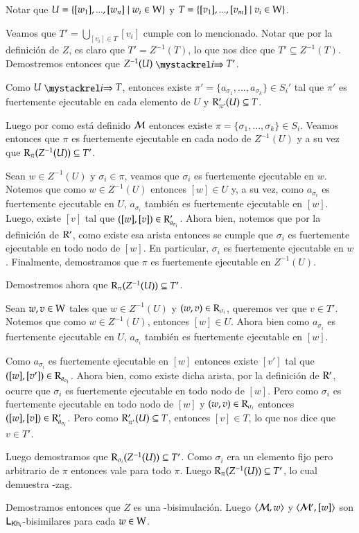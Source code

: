 \begin{demostracion}
\begin{itemize}
        Notar que $U = \{[w_1],...,[w_n]\mid w_i \in \mathrm{W} \}$ y $T = \{[v_1],...,[v_m]\mid v_i \in \mathrm{W} \}$.
        
        Veamos que $T' = \bigcup\limits_{[v_i] \in T} [v_i]$ cumple con lo mencionado. Notar que por la definición de $Z$, es claro que $T' = Z^{-1}(T)$, lo que nos dice que $T' \subseteq Z^{-1}(T)$. Demostremos entonces que $Z^{-1}(U) \ultsExecAgi T'$. 
    
        Como $U \ultsExecAgi T$, entonces existe $\pi' = \{a_{\sigma_1},...,a_{\sigma_k}\}\in S_i'$ tal que $\pi'$ es fuertemente ejecutable en cada elemento de $U$ y $\mathrm{R}'_{\pi'}(U) \subseteq T$.

        Luego por como está definido $\mathcal{M}$ entonces existe $\pi = \{\sigma_1,...,\sigma_k\} \in S_i$. Veamos entonces que $\pi$ es fuertemente ejecutable en cada nodo de $Z^{-1}(U)$ y a su vez que $\mathrm{R}_\pi(Z^{-1}(U)) \subseteq T'$.

        Sean $w \in Z^{-1}(U)$ y $\sigma_i \in \pi$, veamos que $\sigma_i$ es fuertemente ejecutable en $w$. Notemos que como $w \in Z^{-1}(U)$ entonces $[w] \in U$ y, a su vez, como $a_{\sigma_i}$ es fuertemente ejecutable en $U$, $a_{\sigma_i}$ también es fuertemente ejecutable en $[w]$. Luego, existe $[v]$ tal que $([w],[v]) \in \mathrm{R}'_{a_{\sigma_i}}$. Ahora bien, notemos que por la definición de $\mathrm{R}'$, como existe esa arista entonces se cumple que $\sigma_i$ es fuertemente ejecutable en todo nodo de $[w]$. En particular, $\sigma_i$ es fuertemente ejecutable en $w$. Finalmente, demostramos que $\pi$ es fuertemente ejecutable en $Z^{-1}(U)$.

        Demostremos ahora que $\mathrm{R}_{\pi}(Z^{-1}(U)) \subseteq T'$. 

        Sean $w, v \in \mathrm{W}$ tales que $w \in Z^{-1}(U)$ y $(w,v) \in \mathrm{R}_{\sigma_i}$, queremos ver que $v \in T'$. Notemos que como $w \in Z^{-1}(U)$, entonces $[w] \in U$. Ahora bien como $a_{\sigma_i}$ es fuertemente ejecutable en $U$, $a_{\sigma_i}$ también es fuertemente ejecutable en $[w]$.
        
        Como $a_{\sigma_i}$ es fuertemente ejecutable en $[w]$ entonces existe $[v']$ tal que $([w],[v']) \in \mathrm{R}_{a_{\sigma_i}}$. Ahora bien, como existe dicha arista, por la definición de $\mathrm{R}'$, ocurre que $\sigma_i$ es fuertemente ejecutable en todo nodo de $[w]$. Pero como $\sigma_i$ es fuertemente ejecutable en todo nodo de $[w]$ y $(w,v) \in \mathrm{R}_{\sigma_i}$ entonces $([w],[v]) \in \mathrm{R}'_{a_{\sigma_i}}$. Pero como $\mathrm{R}'_{\pi'}(U) \subseteq T$, entonces $[v] \in T$, lo que nos dice que $v \in T'$.
        
        Luego demostramos que $\mathrm{R}_{\sigma_i}(Z^{-1}(U)) \subseteq T'$. Como $\sigma_i$ era un elemento fijo pero arbitrario de $\pi$ entonces vale para todo $\pi$. Luego $\mathrm{R}_\pi(Z^{-1}(U)) \subseteq T'$, lo cual demuestra \KHilogic-zag.
    \end{itemize}

    Demostramos entonces que $Z$ es una \KHilogic-bisimulación. Luego $\langle \mathcal{M},w \rangle$ y $\langle \mathcal{M}',[w] \rangle$ son $\mathsf{L}_{\mathsf{Kh}_i}$-bisimilares para cada $w \in \mathrm{W}$.
    
\end{demostracion}



